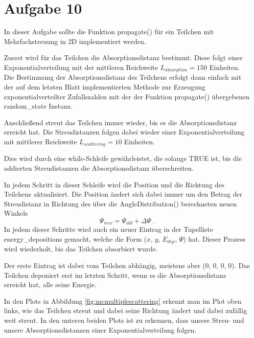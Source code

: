 \section{Aufgabe 10}

In dieser Aufgabe sollte die Funktion propagate() für ein Teilchen mit
Mehrfachstreuung in 2D implementiert werden.

Zuerst wird für das Teilchen die Absorptionsdistanz bestimmt.
Diese folgt einer Exponentialverteilung mit der mittleren Reichweite $L_{absorption} = 150$ Einheiten.
Die Bestimmung der Absorptionsdistanz des Teilchens erfolgt dann einfach mit der auf dem letzten Blatt
implementierten Methode zur Erzeugung exponentialverteilter Zufallszahlen mit der
der Funktion propagate() übergebenen random\_state Instanz.

Anschließend streut das Teilchen immer wieder, bis es die Absorptionsdistanz erreicht hat.
Die Streudistanzen folgen dabei wieder einer Exponentialverteilung mit mittlerer Reichweite
$L_{scattering} = 10$ Einheiten. 

Dies wird durch eine while-Schleife gewährleistet, die solange TRUE ist, bis die
addierten Streudistanzen die Absorptionsdistanz überschreiten.

In jedem Schritt in dieser Schleife wird die Position und die Richtung des Teilchens aktualisiert.
Die Position ändert sich dabei immer um den Betrag der Streudistanz in Richtung
des über die AngleDistribution() berechneten neuen Winkels
\begin{equation*}
    \Psi_{new} = \Psi_{old} + \Delta\Psi \;.
\end{equation*}
In jedem dieser Schritte wird auch ein neuer Eintrag in der Tupelliste energy\_depositions gemacht,
welche die Form ($x$, $y$, $E_{dep}$, $\Psi$) hat.
Dieser Prozess wird wiederholt, bis das Teilchen absorbiert wurde.

Der erste Eintrag ist dabei vom Teilchen abhängig, meistens aber ($0$, $0$, $0$, $0$).
Das Teilchen deponiert erst im letzten Schritt, wenn es die Absorptionsdistanz erreicht hat, alle seine Energie.

In den Plots in Abbildung \ref{fig:mcmultiplescattering} erkennt man im Plot oben links,
wie das Teilchen streut und dabei seine Richtung ändert und dabei zufällig weit streut.
In den unteren beiden Plots ist zu erkennen, dass unsere Streu- und unsere Absorptionsdistanzen einer 
Exponentialverteilung folgen.

